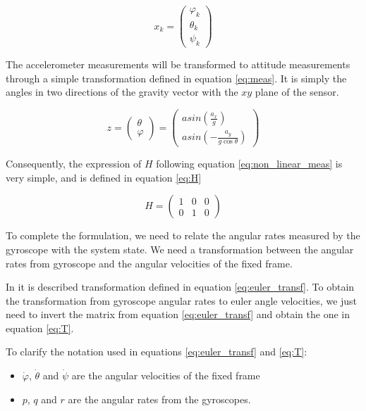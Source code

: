 \begin{equation}
    \label{eq:system}
    x_k = 
        \begin{pmatrix}
            \varphi_k \\
            \theta_k \\
            \psi_k
        \end{pmatrix}
\end{equation}

The accelerometer measurements will be transformed to attitude measurements through a simple transformation defined in equation \ref{eq:meas}. It is simply the angles in two directions of the gravity vector with the $xy$ plane of the sensor.

\begin{equation}
    \label{eq:meas}
    z =
    \begin{pmatrix}
        \theta\\
        \varphi
    \end{pmatrix}
    = 
    \begin{pmatrix}
        asin \left( \frac{a_x}{g} \right) \\
        asin \left( -\frac{a_y}{g \cos \theta} \right)
    \end{pmatrix}
\end{equation}

Consequently, the expression of $H$ following equation \ref{eq:non_linear_meas} is very simple, and is defined in equation \ref{eq:H}

\begin{equation}
\label{eq:H}
H =
\begin{pmatrix}
1 & 0 & 0 \\
0 & 1 & 0
\end{pmatrix}
\end{equation}

To complete the formulation, we need to relate the angular rates measured by the gyroscope with the system state.
We need a transformation between the angular rates from gyroscope and the angular velocities of the fixed frame.

In \cite{ekf} it is described transformation defined in equation \ref{eq:euler_transf}. To obtain the transformation from gyroscope angular rates to euler angle velocities, we just need to invert the matrix from equation \ref{eq:euler_transf} and obtain the one in equation \ref{eq:T}.

To clarify the notation used in equations \ref{eq:euler_transf} and \ref{eq:T}:
\begin{itemize}
\item $\dot{\varphi}$, $\dot{\theta}$ and $\dot{\psi}$ are the angular velocities of the fixed frame
\item $p$, $q$ and $r$ are the angular rates from the gyroscopes.
\end{itemize}

